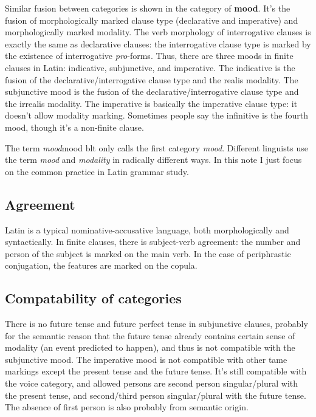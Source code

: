 \documentclass[a4paper, oneside]{report}
\newcommand*{\concept}[1]{\textbf{#1}}
\newcommand*{\term}[1]{\emph{#1}}
\begin{document}
Similar fusion between categories is shown in the category of \concept{mood}.
It's the fusion of morphologically marked clause type 
(declarative and imperative)
and morphologically marked modality.
The verb morphology of interrogative clauses is exactly the same as declarative clauses:
the interrogative clause type is marked by the existence of interrogative \term{pro}-forms.
Thus, there are three moods in finite clauses in Latin:
\acl{indicative}, \acl{subjunctive}, and \acl{imperative}.
The \acl{indicative} is the fusion of 
the declarative/interrogative clause type and the realis modality.
The \acl{subjunctive} mood is the fusion of 
the declarative/interrogative clause type and the irrealis modality.
The \acl{imperative} is basically the imperative clause type:
it doesn't allow modality marking.
Sometimes people say the infinitive is the fourth mood,
though it's a non-finite clause.

\begin{infobox}{The term \term{mood}}{mood}
    \acs{blt} only calls the first category \term{mood}.
    Different linguists use the term \term{mood} and \term{modality} in radically different ways.
    In this note I just focus on the common practice in Latin grammar study.
\end{infobox}

\subsection{Agreement}\label{sec:agreement-abs}

Latin is a typical nominative-accusative language,
both morphologically and syntactically.
In finite clauses, 
there is subject-verb agreement:
the number and person of the subject is marked on the main verb.
In the case of periphrastic conjugation,
the features are marked on the copula.

\subsection{Compatability of categories}

There is no \acl{future} tense and \acl{future perfect} tense in subjunctive clauses,
probably for the semantic reason
that the future tense already contains certain sense of modality
(an event predicted to happen),
and thus is not compatible with the \acl{subjunctive} mood.
The \acl{imperative} mood is not compatible with other \ac{tame} markings
except the \acl{present} tense and the \acl{future} tense.
It's still compatible with the voice category,
and allowed persons are 
second person singular/plural with the \acl{present} tense,
and second/third person singular/plural with the \acl{future} tense.
The absence of first person is also probably from semantic origin.
\end{document}
